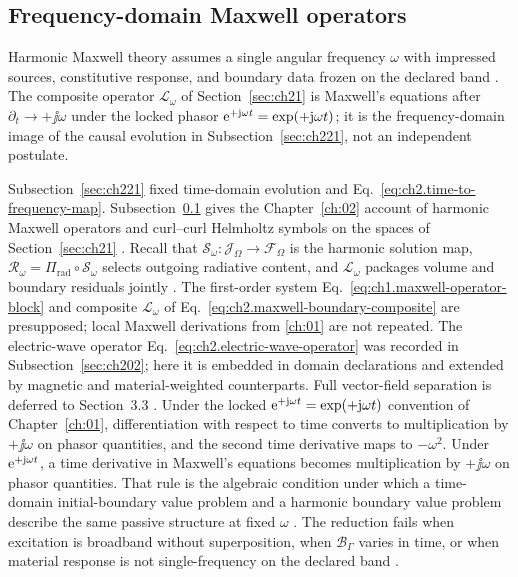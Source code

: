 \subsection{Frequency-domain Maxwell operators}
\label{sec:ch222}

Harmonic Maxwell theory assumes a single angular frequency $\omega$ with impressed sources,
constitutive response, and boundary data frozen on the declared band \cite{harrington2001,stratton1941}.
The composite operator $\mathcal{L}_\omega$ of Section~\ref{sec:ch21} is Maxwell's equations
after $\partial_t\to+\jj\omega$ under the locked phasor $\mathrm{e}^{+\mathrm{j}\omega t}=\exp(+\mathrm{j}\omega t)$; it is the
frequency-domain image of the causal evolution in Subsection~\ref{sec:ch221}, not an independent postulate.

Subsection~\ref{sec:ch221} fixed time-domain evolution and
Eq.~\eqref{eq:ch2.time-to-frequency-map}. Subsection~\ref{sec:ch222} gives the
Chapter~\ref{ch:02} account of harmonic Maxwell operators and curl--curl Helmholtz
symbols on the spaces of Section~\ref{sec:ch21} \cite{stratton1941}. Recall that
$\mathcal{S}_\omega:\mathcal{J}_\Omega\to\mathcal{F}_\Omega$ is the harmonic solution map,
$\mathcal{R}_\omega=\Pi_{\mathrm{rad}}\circ\mathcal{S}_\omega$ selects outgoing radiative
content, and $\mathcal{L}_\omega$ packages volume and boundary residuals jointly
\cite{harrington2001}.
The first-order system Eq.~\eqref{eq:ch1.maxwell-operator-block} and composite
\(\mathcal{L}_\omega\) of Eq.~\eqref{eq:ch2.maxwell-boundary-composite} are
presupposed; local Maxwell derivations from \ref{ch:01} are not repeated.
The electric-wave operator Eq.~\eqref{eq:ch2.electric-wave-operator} was recorded in
Subsection~\ref{sec:ch202}; here it is embedded in domain declarations and extended
by magnetic and material-weighted counterparts. Full vector-field separation is
deferred to Section~3.3 \cite{stratton1941}.
Under the locked \(\mathrm{e}^{+\mathrm{j}\omega t}=\exp(+\mathrm{j}\omega t)\) convention of Chapter~\ref{ch:01}, differentiation with respect to
time converts to multiplication by \(+\jj\omega\) on phasor quantities, and the
second time derivative maps to \(-\omega^{2}\).
Under $\mathrm{e}^{+\mathrm{j}\omega t}$, a time derivative in Maxwell's equations becomes multiplication by
$+\jj\omega$ on phasor quantities. That rule is the algebraic condition under which a
time-domain initial-boundary value problem and a harmonic boundary value problem describe
the same passive structure at fixed $\omega$ \cite{stratton1941}. The reduction fails when
excitation is broadband without superposition, when $\mathcal{B}_\Gamma$ varies in time, or
when material response is not single-frequency on the declared band \cite{harrington2001}.
